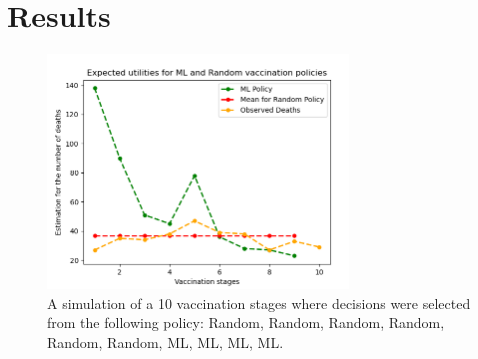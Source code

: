\documentclass{article}
\begin{document}

\section{Results}

\begin{figure}[H]
    \includegraphics[width=8cm]{line_plot.png}
    \centering
    \caption{A simulation of a 10 vaccination stages where decisions were selected from the following policy: Random, Random, Random, Random, Random, Random, ML, ML, ML, ML.}
    \label{fig:1}
\end{figure}
\end{document}
